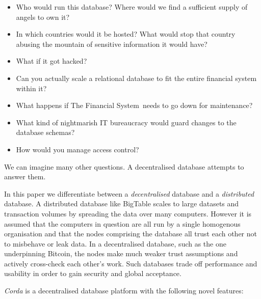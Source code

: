 \documentclass{article}
\begin{document}
\begin{itemize}
\item Who would run this database? Where would we find a sufficient supply of angels to own it?
\item In which countries would it be hosted? What would stop that country abusing the mountain of sensitive information it would have?
\item What if it got hacked?
\item Can you actually scale a relational database to fit the entire financial system within it?
\item What happens if The Financial System\texttrademark~needs to go down for maintenance?
\item What kind of nightmarish IT bureaucracy would guard changes to the database schemas?
\item How would you manage access control?
\end{itemize}

We can imagine many other questions. A decentralised database attempts to answer them.

In this paper we differentiate between a \emph{decentralised} database and a \emph{distributed} database. A distributed
database like BigTable\cite{BigTable} scales to large datasets and transaction volumes by spreading the data over many
computers. However it is assumed that the computers in question are all run by a single homogenous organisation and that
the nodes comprising the database all trust each other not to misbehave or leak data. In a decentralised database, such
as the one underpinning Bitcoin\cite{Bitcoin}, the nodes make much weaker trust assumptions and actively cross-check
each other's work. Such databases trade off performance and usability in order to gain security and global acceptance.

\emph{Corda} is a decentralised database platform with the following novel features:
\end{document}
